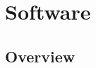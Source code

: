 
\chapter{Software}
\label{ch:Software}

\section{Overview}

\begin{comment}
\begin{figure}[H]
    \centering
    \begin{tikzpicture}[node distance = 3cm, auto]
        \node [block] (AB) {\acs{ARC}bus interface};
        \node [block,right of=AB] (KF) {Kalman Filter};
        \node [block,above of=KF] (alg) {\acs{ACDS} algorithm};
        \node [block,above of=AB] (CMD) {\acs{ACDS} command parse};
        \node [block,right of=alg] (TQ) {Torquer Control and state tracking};
        \node [block,right of=KF] (HC) {House Keeping};
        \node [point,below of=KF] (DN)  {};

        \path [flow] (KF) -- (alg);
        \path [flow] (AB) -- (CMD);
        \path [flow] (alg) -- (TQ);
        \path [flow] (AB) -- (KF);

        \path [flow] (CMD) -- (KF);
        \path [flow] (CMD) -- (alg);

        \path [flow] (alg) -- (HC);
        \path [flow] (KF) -- (HC);
        \path [flow] (TQ) -- (HC);
        \path [flow] (HC) |- (DN);
        \path [flow] (DN) -| (AB);

    \end{tikzpicture}
    \caption{\acs{ACDS} software overview}
\end{figure}
\end{comment}

